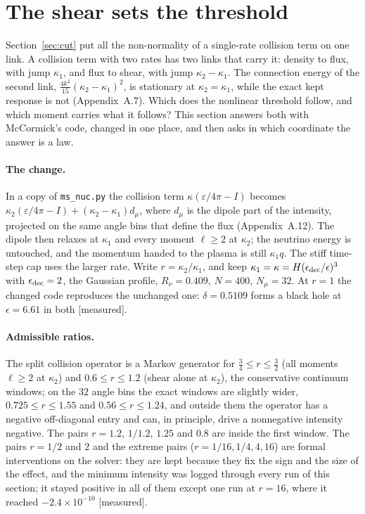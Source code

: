 \documentclass[11pt]{article}
\newcommand{\grade}[1]{\textsf{\small[#1]}}
\begin{document}
\section{The shear sets the threshold}\label{sec:link}

Section~\ref{sec:cut} put all the non-normality of a single-rate collision term on one link. A collision term with two rates has two links that carry it: density to flux, with jump $\kappa_1$, and flux to shear, with jump $\kappa_2-\kappa_1$. The connection energy of the second link, $\tfrac{4k^2}{15}(\kappa_2-\kappa_1)^2$, is stationary at $\kappa_2=\kappa_1$, while the exact kept response is not (Appendix~A.7). Which does the nonlinear threshold follow, and which moment carries what it follows? This section answers both with McCormick's code, changed in one place, and then asks in which coordinate the answer is a law.

\paragraph{The change.} In a copy of \texttt{ms\_nuc.py} the collision term $\kappa(\varepsilon/4\pi-I)$ becomes $\kappa_2(\varepsilon/4\pi-I)+(\kappa_2-\kappa_1)d_\mu$, where $d_\mu$ is the dipole part of the intensity, projected on the same angle bins that define the flux (Appendix~A.12). The dipole then relaxes at $\kappa_1$ and every moment $\ell\ge2$ at $\kappa_2$; the neutrino energy is untouched, and the momentum handed to the plasma is still $\kappa_1q$. The stiff time-step cap uses the larger rate. Write $r=\kappa_2/\kappa_1$, and keep $\kappa_1=\kappa=H(\epsilon_{\rm dec}/\epsilon)^3$ with $\epsilon_{\rm dec}=2$, the Gaussian profile, $R_\nu=0.409$, $N=400$, $N_\mu=32$. At $r=1$ the changed code reproduces the unchanged one: $\delta=0.5109$ forms a black hole at $\epsilon=6.61$ in both \grade{measured}.

\paragraph{Admissible ratios.} The split collision operator is a Markov generator for $\tfrac34\le r\le\tfrac32$ (all moments $\ell\ge2$ at $\kappa_2$) and $0.6\le r\le1.2$ (shear alone at $\kappa_2$), the conservative continuum windows; on the $32$ angle bins the exact windows are slightly wider, $0.725\le r\le1.55$ and $0.56\le r\le1.24$, and outside them the operator has a negative off-diagonal entry and can, in principle, drive a nonnegative intensity negative. The pairs $r=1.2$, $1/1.2$, $1.25$ and $0.8$ are inside the first window. The pairs $r=1/2$ and $2$ and the extreme pairs ($r=1/16,1/4,4,16$) are formal interventions on the solver: they are kept because they fix the sign and the size of the effect, and the minimum intensity was logged through every run of this section; it stayed positive in all of them except one run at $r=16$, where it reached $-2.4\times10^{-10}$ \grade{measured}.
\end{document}
